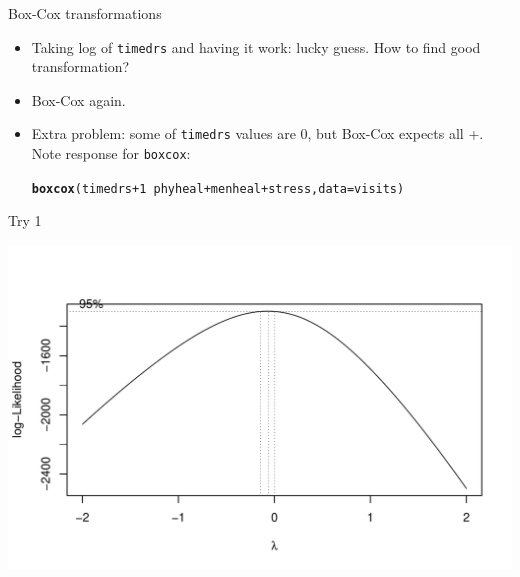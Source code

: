 \documentclass[unknownkeysallowed]{beamer}\usepackage[]{graphicx}\usepackage[]{color}
\makeatletter
\def\maxwidth{ %
  \ifdim\Gin@nat@width>\linewidth
    \linewidth
  \else
    \Gin@nat@width
  \fi
}
\newcommand{\hlnum}[1]{\textcolor[rgb]{0.686,0.059,0.569}{#1}}%
\newcommand{\hlopt}[1]{\textcolor[rgb]{0,0,0}{#1}}%
\newcommand{\hlstd}[1]{\textcolor[rgb]{0.345,0.345,0.345}{#1}}%
\newcommand{\hlkwc}[1]{\textcolor[rgb]{0.333,0.667,0.333}{#1}}%
\newcommand{\hlkwd}[1]{\textcolor[rgb]{0.737,0.353,0.396}{\textbf{#1}}}%
\newenvironment{kframe}{%
 \def\at@end@of@kframe{}%
 \ifinner\ifhmode%
  \def\at@end@of@kframe{\end{minipage}}%
  \begin{minipage}{\columnwidth}%
 \fi\fi%
 \def\FrameCommand##1{\hskip\@totalleftmargin \hskip-\fboxsep
 \colorbox{shadecolor}{##1}\hskip-\fboxsep
     \hskip-\linewidth \hskip-\@totalleftmargin \hskip\columnwidth}%
 \MakeFramed {\advance\hsize-\width
   \@totalleftmargin\z@ \linewidth\hsize
   \@setminipage}}%
 {\par\unskip\endMakeFramed%
 \at@end@of@kframe}
\newenvironment{knitrout}{}{} %
\makeatother
\begin{document}
\begin{frame}[fragile]{Box-Cox transformations}


  \begin{itemize}
  \item Taking log of \verb-timedrs- and having it work: lucky
    guess. How to find good transformation?
  \item Box-Cox again.
  \item Extra problem: some of \verb-timedrs- values are 0, but
    Box-Cox expects all +. Note response for \texttt{boxcox}:

 
\begin{knitrout}
\color{fgcolor}\begin{kframe}
\begin{alltt}
\hlkwd{boxcox}\hlstd{(timedrs}\hlopt{+}\hlnum{1}\hlopt{~}\hlstd{phyheal}\hlopt{+}\hlstd{menheal}\hlopt{+}\hlstd{stress,}\hlkwc{data}\hlstd{=visits)}
\end{alltt}
\end{kframe}
\end{knitrout}
  \end{itemize}

\end{frame}


\begin{frame}[fragile]{Try 1}

 
\begin{knitrout}
\color{fgcolor}
\includegraphics[width=\maxwidth]{figure/unnamed-chunk-38-1} 

\end{knitrout}
  
  
\end{frame}
\end{document}
